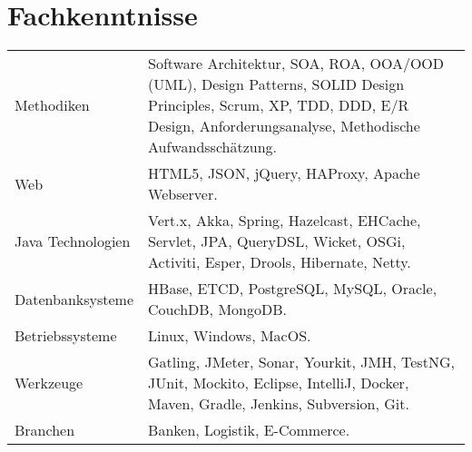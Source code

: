 \section*{Fachkenntnisse}
\begin{longtable}{@{}p{6cm}p{10cm}}
Methodiken	        & Software Architektur, SOA, ROA, OOA/OOD (UML), Design Patterns, SOLID Design Principles, Scrum, XP, TDD, DDD, E/R Design, Anforderungsanalyse, Methodische Aufwandsschätzung.\\
Web         	    & HTML5, JSON, jQuery, HAProxy, Apache Webserver.\\
Java Technologien	& Vert.x, Akka, Spring, Hazelcast, EHCache, Servlet, JPA, QueryDSL, Wicket, OSGi, Activiti, Esper, Drools, Hibernate, Netty.\\
Datenbanksysteme	& HBase, ETCD, PostgreSQL, MySQL, Oracle, CouchDB, MongoDB.\\
Betriebssysteme	    & Linux, Windows, MacOS.\\
Werkzeuge		    & Gatling, JMeter, Sonar, Yourkit, JMH, TestNG, JUnit, Mockito, Eclipse, IntelliJ, Docker, Maven, Gradle, Jenkins, Subversion, Git.\\
Branchen		    & Banken, Logistik, E-Commerce.\\
\end{longtable}
